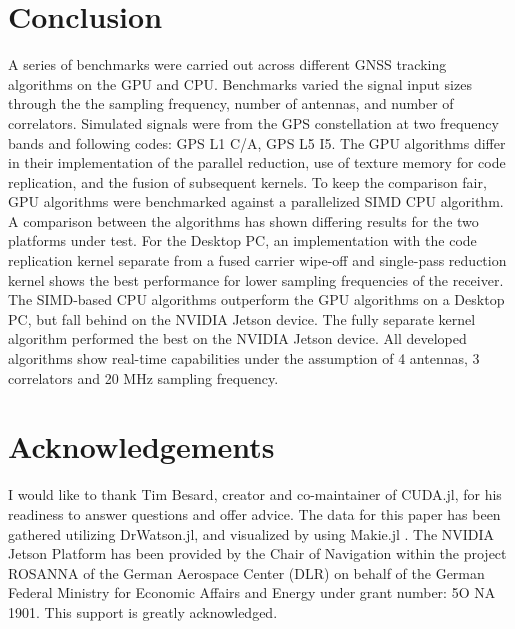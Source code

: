 \documentclass{juliacon}
\begin{document}
\section{Conclusion}\label{sec:conclusion}
A series of benchmarks were carried out across different GNSS tracking algorithms on the GPU and CPU. Benchmarks varied the signal input sizes through the the sampling frequency, number of antennas, and number of correlators. Simulated signals were from the GPS constellation at two frequency bands and following codes: GPS L1 C/A, GPS L5 I5. The GPU algorithms differ in their implementation of the parallel reduction, use of texture memory for code replication, and the fusion of subsequent kernels. To keep the comparison fair, GPU algorithms were benchmarked against a parallelized SIMD CPU algorithm. A comparison between the algorithms has shown differing results for the two platforms under test. For the Desktop PC, an implementation with the code replication kernel separate from a fused carrier wipe-off and single-pass reduction kernel shows the best performance for lower sampling frequencies of the receiver. The SIMD-based CPU algorithms outperform the GPU algorithms on a Desktop PC, but fall behind on the NVIDIA Jetson device. The fully separate kernel algorithm performed the best on the NVIDIA Jetson device. All developed algorithms show real-time capabilities under the assumption of 4 antennas, 3 correlators and 20 MHz sampling frequency.

\section*{Acknowledgements}
I would like to thank Tim Besard, creator and co-maintainer of CUDA.jl, for his readiness to answer questions and offer advice. The data for this paper has been gathered utilizing DrWatson.jl, and visualized by using Makie.jl \cite{Datseris2020, Danisch2021}. The NVIDIA Jetson Platform has been provided by the Chair of Navigation within the project ROSANNA of the German Aerospace Center (DLR) on behalf of the German Federal Ministry for Economic Affairs and Energy under grant number: 5O NA 1901. This support is greatly acknowledged.



\newpage
\end{document}
